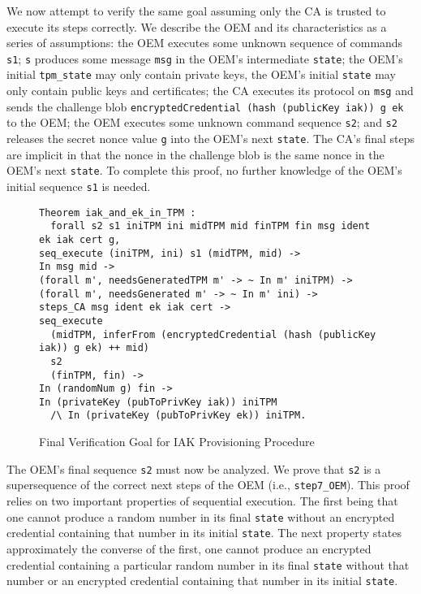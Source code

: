 \documentclass[runningheads]{llncs}
\begin{document}
We now attempt to verify the same goal assuming only the CA is trusted
to execute its steps correctly.  We describe the OEM and its
characteristics as a series of assumptions: the OEM executes some
unknown sequence of commands \verb|s1|; \verb|s| produces some message
\verb|msg| in the OEM's intermediate \verb|state|; the OEM's initial
\verb|tpm_state| may only contain private keys, the OEM's initial
\verb|state| may only contain public keys and certificates; the CA
executes its protocol on \verb|msg| and sends the challenge blob
\verb|encryptedCredential (hash (publicKey iak)) g ek| to the OEM; the
OEM executes some unknown command sequence \verb|s2|; and \verb|s2|
releases the secret nonce value \verb|g| into the OEM's next
\verb|state|. The CA's final steps are implicit in that the nonce in
the challenge blob is the same nonce in the OEM's next \verb|state|.
To complete this proof, no further knowledge of the OEM's initial
sequence \verb|s1| is needed.

\begin{figure}[hptb]
\begin{lstlisting}[language=Coq]
Theorem iak_and_ek_in_TPM :
  forall s2 s1 iniTPM ini midTPM mid finTPM fin msg ident ek iak cert g,
seq_execute (iniTPM, ini) s1 (midTPM, mid) -> 
In msg mid ->
(forall m', needsGeneratedTPM m' -> ~ In m' iniTPM) ->
(forall m', needsGenerated m' -> ~ In m' ini) ->
steps_CA msg ident ek iak cert ->
seq_execute
  (midTPM, inferFrom (encryptedCredential (hash (publicKey iak)) g ek) ++ mid)
  s2 
  (finTPM, fin) ->
In (randomNum g) fin ->
In (privateKey (pubToPrivKey iak)) iniTPM
  /\ In (privateKey (pubToPrivKey ek)) iniTPM.
\end{lstlisting}
\caption{Final Verification Goal for IAK Provisioning Procedure}
\label{fig:iak_goal}
\end{figure}

The OEM's final sequence \verb|s2| must now be analyzed.  We prove
that \verb|s2| is a supersequence of the correct next steps of the OEM
(i.e., \verb|step7_OEM|). This proof relies on two important
properties of sequential execution. The first being that one cannot
produce a random number in its final \verb|state| without an encrypted
credential containing that number in its initial \verb|state|. The
next property states approximately the converse of the first, one
cannot produce an encrypted credential containing a particular random
number in its final \verb|state| without that number or an encrypted
credential containing that number in its initial \verb|state|.
\end{document}
